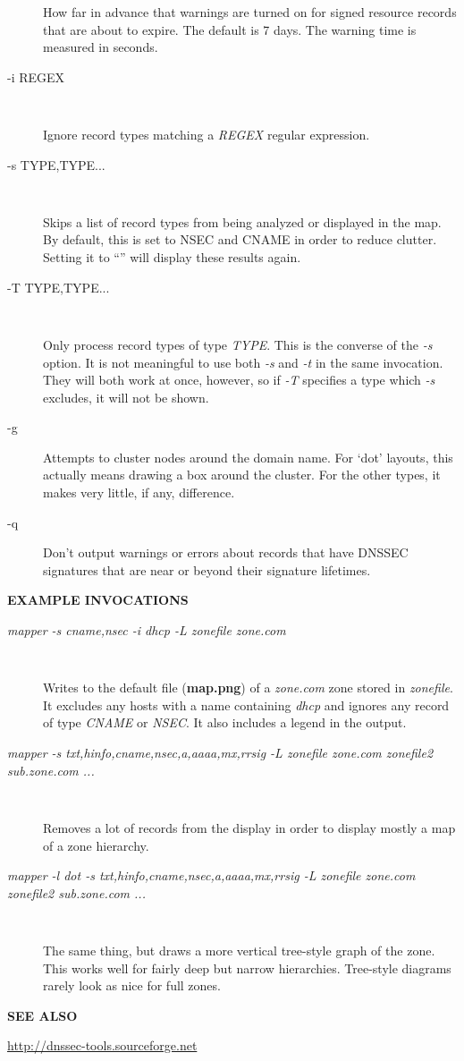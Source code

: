 \begin{description}
How far in advance that warnings are turned on for signed
resource records that are about to expire.  The default is 7 days.
The warning time is measured in seconds.

\item [-i REGEX]\verb" "

Ignore record types matching a {\it REGEX} regular expression.

\item [-s TYPE,TYPE...]\verb" "

Skips a list of record types from being analyzed or displayed in the map.
By default, this is set to NSEC and CNAME in order to reduce clutter.
Setting it to ``'' will display these results again.

\item [-T TYPE,TYPE...]\verb" "

Only process record types of type {\it TYPE}.  This is the converse of the
{\it -s} option.  It is not meaningful to use both {\it -s} and {\it -t}
in the same invocation.  They will both work at once, however, so if
{\it -T} specifies a type which {\it -s} excludes, it will not be shown.

\item [-g]

Attempts to cluster nodes around the domain name.  For `dot' layouts,
this actually means drawing a box around the cluster.  For the other
types, it makes very little, if any, difference.

\item [-q]

Don't output warnings or errors about records that have DNSSEC signatures
that are near or beyond their signature lifetimes.

\end{description}

{\bf EXAMPLE INVOCATIONS}

\begin{description}

\item [{\it mapper -s cname,nsec -i dhcp -L zonefile zone.com}]\verb" "

Writes to the default file ({\bf map.png}) of a {\it zone.com} zone
stored in {\it zonefile}.  It excludes any hosts with a name containing
{\it dhcp} and ignores any record of type {\it CNAME} or {\it NSEC}.  It also
includes a legend in the output.

\item [{\it mapper -s txt,hinfo,cname,nsec,a,aaaa,mx,rrsig -L zonefile zone.com zonefile2 sub.zone.com ...}]\verb" "

Removes a lot of records from the display in order to display mostly a
map of a zone hierarchy.

\item [{\it mapper -l dot -s txt,hinfo,cname,nsec,a,aaaa,mx,rrsig -L zonefile zone.com zonefile2 sub.zone.com ...}]\verb" "

The same thing, but draws a more vertical tree-style graph of the
zone.  This works well for fairly deep but narrow hierarchies.  Tree-style
diagrams rarely look as nice for full zones.

\end{description}

{\bf SEE ALSO}


\url{http://dnssec-tools.sourceforge.net}

